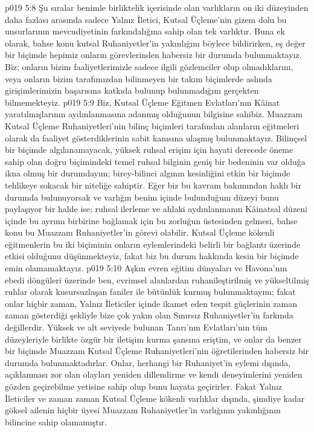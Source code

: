 \vs p019 5:8 Şu sıralar benimle birliktelik içerisinde olan varlıkların on iki düzeyinden daha fazlası arasında sadece Yalnız İletici, Kutsal Üçleme’nin gizem dolu bu unsurlarının mevcudiyetinin farkındalığına sahip olan tek varlıktır. Buna ek olarak, bahse konu kutsal Ruhaniyetler’in yakınlığını böylece bildirirken, eş değer bir biçimde hepimiz onların görevlerinden habersiz bir durumda bulunmaktayız. Biz; onların bizim faaliyetlerimizle sadece ilgili gözlemciler olup olmadıklarını, veya onların bizim tarafımızdan bilinmeyen bir takım biçimlerde aslında girişimlerimizin başarısına katkıda bulunup bulunmadığını gerçekten bilmemekteyiz.
\vs p019 5:9 Biz, Kutsal Üçleme Eğitmen Evlatları’nın Kâinat yaratılmışlarının  aydınlanmasına adanmış olduğunun bilgisine sahibiz. Muazzam Kutsal Üçleme Ruhaniyetleri’nin bilinç biçimleri tarafından alanların eğitmeleri olarak da faaliyet gösterdiklerinin sabit kanısına ulaşmış bulunmaktayız. Bilinçsel bir biçimde algılanamayacak, yüksek ruhsal erişim için hayati derecede öneme sahip olan doğru biçimindeki temel ruhsal bilginin geniş bir bedeninin var olduğa ikna olmuş bir durumdayım; birey\hyp{}bilinci algının kesinliğini etkin bir biçimde tehlikeye sokacak bir niteliğe sahiptir. Eğer biz bu kavram bakımından haklı bir durumda bulunuyorsak ve varlığın benim içinde bulunduğum düzeyi bunu paylaşıyor bir halde ise; ruhsal ilerleme ve ahlaki aydınlanmanın Kâinatsal düzeni içinde bu ayrımı birbirine bağlamak için bu zorluğun üstesinden gelmesi, bahse konu bu Muazzam Ruhaniyetler’in görevi olabilir. Kutsal Üçleme kökenli eğitmenlerin bu iki biçiminin onların eylemlerindeki belirli bir bağlantı üzerinde etkisi olduğunu düşünmekteyiz, fakat biz bu durum hakkında kesin bir biçimde emin olamamaktayız.
\vs p019 5:10 Aşkın evren eğitim dünyaları ve Havona’nın ebedi döngüleri üzerinde ben, evrimsel alanlardan ruhanileştirilmiş ve yükseltilmiş ruhlar olarak kusursuzlaşan faniler ile bütünlük kurmuş bulunmaktayım; fakat onlar hiçbir zaman, Yalnız İleticiler içinde ikamet eden tespit güçlerinin zaman zaman gösterdiği şekliyle bize çok yakın olan Sınırsız Ruhaniyetler’in farkında değillerdir. Yüksek ve alt seviyede bulunan Tanrı’nın Evlatları’nın tüm düzeyleriyle birlikte özgür bir iletişim kurma şansına eriştim, ve onlar da benzer bir biçimde Muazzam Kutsal Üçleme Ruhaniyetleri’nin öğretilerinden habersiz bir durumda bulunmaktadırlar. Onlar, herhangi bir Ruhaniyet’in eylemi dışında, açıklanması zor olan olayları yeniden dillendirme ve kendi deneyimlerini yeniden gözden geçirebilme yetisine sahip olup bunu hayata geçirirler. Fakat Yalnız İleticiler ve zaman zaman Kutsal Üçleme kökenli varlıklar dışında, şimdiye kadar göksel ailenin hiçbir üyesi Muazzam Ruhaniyetler’in varlığının yakınlığının bilincine sahip olamamıştır.
